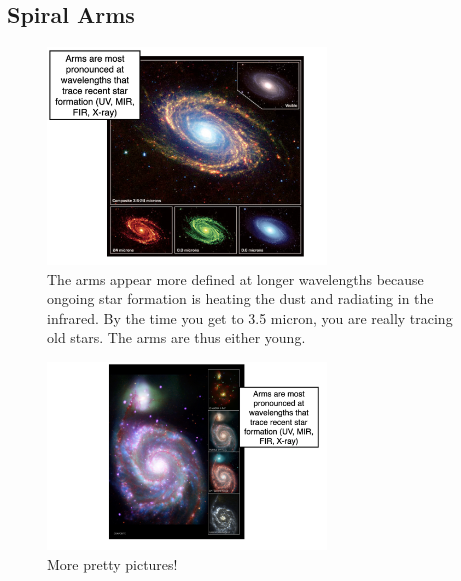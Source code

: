 \documentclass{article}
\begin{document}
\subsection{Spiral Arms}

\begin{figure}
    \centering
    \includegraphics[width=0.66\textwidth]{figs/Screen Shot 2021-10-27 at 9.51.41 AM.png}
    \caption{The arms appear more defined at longer wavelengths because ongoing star formation is heating the dust and radiating in the infrared. By the time you get to 3.5 micron, you are really tracing old stars. The arms are thus either young.}
    \label{fig:spirals_arms}
\end{figure}

\begin{figure}
    \centering
    \includegraphics[width=0.66\textwidth]{figs/Screen Shot 2021-10-27 at 9.54.24 AM.png}
    \caption{More pretty pictures!}
    \label{fig:more_spiral_arms}
\end{figure}
\end{document}
